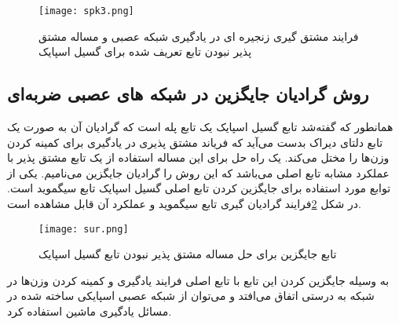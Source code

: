 \begin{figure}[htbp]
	\centering
	\texttt{[image: spk3.png]}
	\captionsetup{font=small} %
	\caption{فرایند مشتق گیری زنجیره ‌ای در یادگیری شبکه عصبی و مساله مشتق پذیر نبودن تابع تعریف شده برای گسیل اسپایک }
	\label{fig:neuron12}
\end{figure}



\subsection{روش گرادیان جایگزین در شبکه های عصبی ضربه‌ای}

همانطور که گفته‌شد تابع گسیل اسپایک یک تابع پله است که گرادیان آن به صورت یک تابع دلتای دیراک بدست ‌می‌آید که فریاند مشتق پذیری در یادگیری برای کمینه کردن وزن‌ها را مختل می‌کند. یک راه حل برای این مساله استفاده از یک تابع مشتق پذیر با عملکرد مشابه تابع اصلی می‌باشد که این روش را گرادیان جایگزین می‌نامیم. 
یکی از توابع مورد استفاده برای جایگزین کردن تابع اصلی گسیل اسپایک تابع سیگموید است. در شکل \ref{fig:neuron13}فرایند گرادیان گیری تابع سیگموید و عملکرد آن قابل مشاهده است.

\begin{figure}[htbp]
	\centering
	\texttt{[image: sur.png]}
	\captionsetup{font=small} %
	\caption{تابع جایگزین برای حل مساله مشتق پذیر نبودن تابع گسیل اسپایک}
	\label{fig:neuron13}
\end{figure}


به وسیله جایگزین کردن این تابع با تابع اصلی فرایند یادگیری و کمینه کردن وزن‌ها در شبکه به درستی اتفاق می‌افتد و می‌توان از شبکه عصبی اسپایکی ساخته شده در مسائل یادگیری ماشین استفاده کرد.







